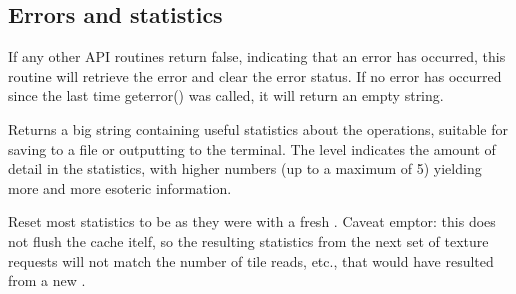 \subsection{Errors and statistics}
\label{sec:imagecache:api:geterror}
\label{sec:imagecache:api:getstats}
\label{sec:imagecache:api:resetstats}

If any other API routines return {\cf false}, indicating that an error
has occurred, this routine will retrieve the error and clear the error
status.  If no error has occurred since the last time {\cf geterror()}
was called, it will return an empty string.
\apiend

Returns a big string containing useful statistics about the \ImageCache
operations, suitable for saving to a file or outputting to the terminal.
The {\cf level} indicates the amount of detail in the statistics,
with higher numbers (up to a maximum of 5) yielding more and more
esoteric information.
\apiend

Reset most statistics to be as they were with a fresh
\ImageCache.  Caveat emptor: this does not flush the cache
itelf, so the resulting statistics from the next set of texture
requests will not match the number of tile reads, etc., that
would have resulted from a new \ImageCache.
\apiend



\chapwidthend
